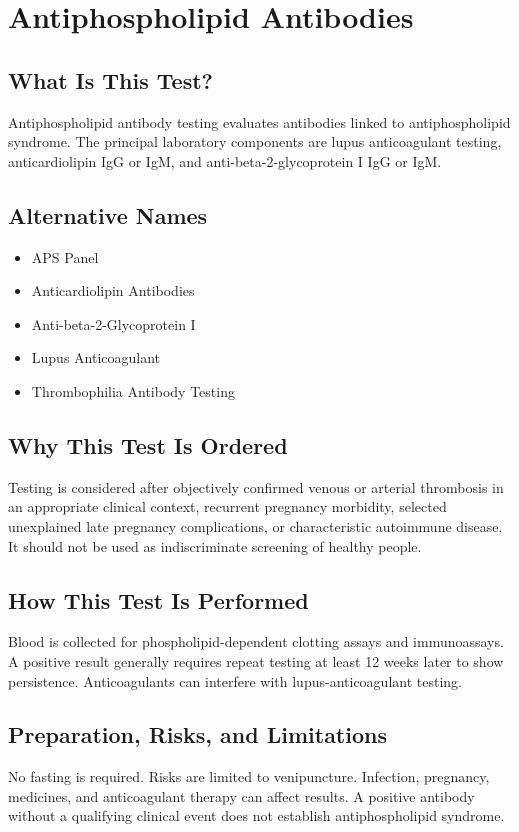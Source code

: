 \chapter{Antiphospholipid Antibodies}

\section*{What Is This Test?}
Antiphospholipid antibody testing evaluates antibodies linked to antiphospholipid syndrome. The principal laboratory components are lupus anticoagulant testing, anticardiolipin IgG or IgM, and anti-beta-2-glycoprotein I IgG or IgM.

\section*{Alternative Names}
\begin{itemize}
  \item APS Panel
  \item Anticardiolipin Antibodies
  \item Anti-beta-2-Glycoprotein I
  \item Lupus Anticoagulant
  \item Thrombophilia Antibody Testing
\end{itemize}
\section*{Why This Test Is Ordered}
Testing is considered after objectively confirmed venous or arterial thrombosis in an appropriate clinical context, recurrent pregnancy morbidity, selected unexplained late pregnancy complications, or characteristic autoimmune disease. It should not be used as indiscriminate screening of healthy people.

\section*{How This Test Is Performed}
Blood is collected for phospholipid-dependent clotting assays and immunoassays. A positive result generally requires repeat testing at least 12 weeks later to show persistence. Anticoagulants can interfere with lupus-anticoagulant testing.

\section*{Preparation, Risks, and Limitations}
No fasting is required. Risks are limited to venipuncture. Infection, pregnancy, medicines, and anticoagulant therapy can affect results. A positive antibody without a qualifying clinical event does not establish antiphospholipid syndrome.

